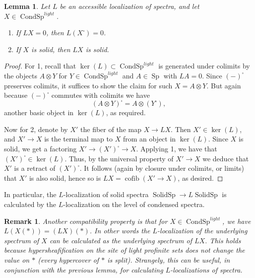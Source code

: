 \documentclass[12pt]{article}
\newtheorem{lemma}[theorem]{Lemma}
\newtheorem{remark}[theorem]{Remark}
\newcommand{\on}{\operatorname}
\begin{document}
\begin{lemma}
Let $L$ be an accessible localization of spectra, and let $X\in \on{CondSp}^{light}$.
\begin{enumerate}
\item If $LX=0$, then $L(X^\square)=0$.
\item If $X$ is solid, then $LX$ is solid.
\end{enumerate}
\end{lemma}
\begin{proof}
For 1, recall that $\on{ker}(L)\subset\on{CondSp}^{light}$ is generated under colimits by the objects $A\otimes Y$ for $Y\in\on{CondSp}^{light}$ and $A\in\on{Sp}$ with $LA=0$.  Since $(-)^\square$ preserves colimits, it suffices to show the claim for such $X=A\otimes Y$.  But again because $(-)^\square$ commutes with colimits we have
$$(A\otimes Y)^\square = A\otimes (Y^\square),$$
another basic object in $\on{ker}(L)$, as required.

Now for 2, denote by $X'$ the fiber of the map $X \to LX$.  Then $X'\in \on{ker}(L)$, and $X' \to X$ is the terminal map to $X$ from an object in $\on{ker}(L)$.  Since $X$ is solid, we get a factoring $X' \to (X')^\square \to X$.  Applying 1, we have that $(X')^\square \in \on{ker}(L)$.   Thus, by the universal property of $X' \to X$ we deduce that $X'$ is a retract of $(X')^\square$.  It follows (again by closure under colimits, or limits) that $X'$ is also solid, hence so is $LX = \on{cofib}(X'\to X)$, as desired.
\end{proof}

In particular, the $L$-localization of solid spectra $\on{SolidSp}\to L\on{SolidSp}$ is calculated by the $L$-localization on the level of condensed spectra.

\begin{remark}\label{localizesolid}
Another compatibility property is that for $X\in\on{CondSp}^{light}$, we have $L(X(\ast)) = (LX)(\ast)$.  In other words the $L$-localization of the underlying spectrum of $X$ can be calculated as the underlying spectrum of $LX$.  This holds because hypersheafification on the site of light profinite sets does not change the value on $\ast$ (every hypercover of $\ast$ is split).  Strangely, this can be useful, in conjunction with the previous lemma, for calculating $L$-localizations of spectra.
\end{remark}
\end{document}
